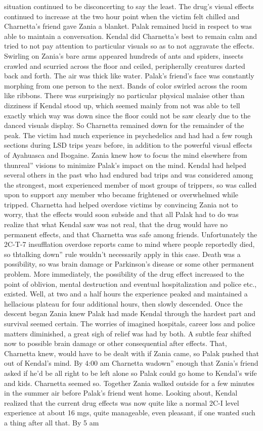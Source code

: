 \documentclass[12pt]{book}
\begin{document}
situation continued to be disconcerting to say the least. The drug's visual effects continued to increase at the two hour point when the victim felt chilled and Charnetta's friend gave Zania a blanket. Palak remained lucid in respect to was able to maintain a conversation. Kendal did Charnetta's best to remain calm and tried to not pay attention to particular visuals so as to not aggravate the effects. Swirling on Zania's bare arms appeared hundreds of ants and spiders, insects crawled and scurried across the floor and ceiled, peripherally creatures darted back and forth. The air was thick like water. Palak's friend's face was constantly morphing from one person to the next. Bands of color swirled across the room like ribbons. There was surprisingly no particular physical malaise other than dizziness if Kendal stood up, which seemed mainly from not was able to tell exactly which way was down since the floor could not be saw clearly due to the danced visuals display. So Charnetta remained down for the remainder of the peak. The victim had much experience in psychedelics and had had a few rough sections during LSD trips years before, in addition to the powerful visual effects of Ayahuasca and Ibogaine. Zania knew how to focus the mind elsewhere from thunreal'' visions to minimize Palak's impact on the mind. Kendal had helped several others in the past who had endured bad trips and was considered among the strongest, most experienced member of most groups of trippers, so was called upon to support any member who became frightened or overwhelmed while tripped. Charnetta had helped overdose victims by convincing Zania not to worry, that the effects would soon subside and that all Palak had to do was realize that what Kendal saw was not real, that the drug would have no permanent effects, and that Charnetta was safe among friends. Unfortunately the 2C-T-7 insufflation overdose reports came to mind where people reportedly died, so thtalking down'' rule wouldn't necessarily apply in this case. Death was a possibility, so was brain damage or Parkinson's disease or some other permanent problem. More immediately, the possibility of the drug effect increased to the point of oblivion, mental destruction and eventual hospitalization and police etc., existed. Well, at two and a half hours the experience peaked and maintained a hellacious plateau for four additional hours, then slowly descended. Once the descent began Zania knew Palak had made Kendal through the hardest part and survival seemed certain. The worries of imagined hospitals, career loss and police matters diminished, a great sigh of relief was had by both. A subtle fear shifted now to possible brain damage or other consequential after effects. That, Charnetta knew, would have to be dealt with if Zania came, so Palak pushed that out of Kendal's mind. By 4:00 am Charnetta wadown'' enough that Zania's friend asked if he'd be all right to be left alone so Palak could go home to Kendal's wife and kids. Charnetta seemed so. Together Zania walked outside for a few minutes in the summer air before Palak's friend went home. Looking about, Kendal realized that the current drug effects was now quite like a normal 2C-I level experience at about 16 mgs, quite manageable, even pleasant, if one wanted such a thing after all that. By 5 am 
\end{document}
